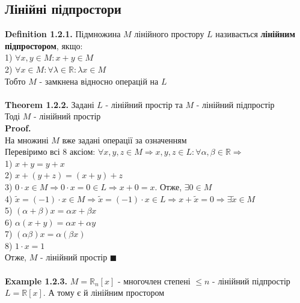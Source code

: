 \documentclass[a4paper, 14pt]{extarticle}
\def\defin#1{\textbf{Definition {#1}}}
\def\ex#1{\textbf{Example {#1}}}
\def\th#1{\textbf{Theorem {#1}}}
\def\proof{\textbf{Proof.}\\}
\def\bigline{\vspace{5mm}\\}
\def\qed{$\blacksquare$}
\begin{document}
	\subsection{Лінійні підпростори}
	\defin{1.2.1.} Підмножина $M$ лінійного простору $L$ називається \textbf{лінійним підпростором}, якщо:\\
	1) $\forall x, y \in M: x + y \in M$\\
	2) $\forall x \in M: \forall \lambda \in \mathbb{R}: \lambda x \in M$\\
	Тобто $M$ - замкнена відносно операцій на $L$\\
	\\
	\th{1.2.2.} Задані $L$ - лінійний простір та $M$ - лінійний підпростір\\
	Тоді $M$ - лінійний простір\\
	\proof
	На множині $M$ вже задані операції за означенням\\
	Перевіримо всі 8 аксіом: $\forall x,y,z \in M \Rightarrow x,y,z \in L: \forall \alpha, \beta \in \mathbb{R} \Rightarrow$\\
	1) $x+y=y+x$\\
	2) $x+(y+z)=(x+y)+z$\\
	3) $0\cdot x \in M \Rightarrow 0 \cdot x = 0 \in L \Rightarrow x + 0 = x$. Отже, $\exists 0 \in M$\\
	4) $\tilde{x} = (-1)\cdot x \in M \Rightarrow \tilde{x} = (-1)\cdot x \in L \Rightarrow x + \tilde{x} = 0 \Rightarrow \exists \tilde{x} \in M$\\
	5) $(\alpha + \beta)x = \alpha x + \beta x$\\
	6) $\alpha (x+y)= \alpha x + \alpha y$\\
	7) $(\alpha \beta) x = \alpha (\beta x)$\\
	8) $1 \cdot x = 1$\\
	Отже, $M$ - лінійний простір \qed \\
	\bigline
	\ex{1.2.3.} $M = \mathbb{R}_n[x]$ - многочлен степені $\leq n$ - лінійний підпростір $L = \mathbb{R}[x]$. А тому є й лінійним простором\\
	
\end{document}
